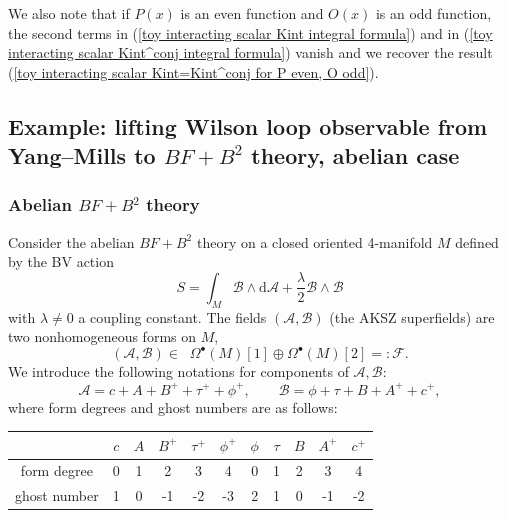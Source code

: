 \documentclass{amsart}
\theoremstyle{plain} %
\theoremstyle{definition}
\theoremstyle{remark}
\newtheorem{rem}[thm]{Remark}
\newcommand{\mr}{\mathrm}
\newcommand{\bt}{\bullet}
\newcommand{\F}{\mathcal{F}}
\newcommand{\ii}{\mathrm{int}}
\newcommand{\A}{\mathcal{A}}
\newcommand{\B}{\mathcal{B}}
\newcommand{\dr}{\mathrm{d}}
\begin{document}
We also note that if $P(x)$ is an even function and $O(x)$ is an odd function, the second terms in (\ref{toy interacting scalar Kint integral formula}) and in (\ref{toy interacting scalar Kint^conj integral formula}) vanish and we recover the result (\ref{toy interacting scalar Kint=Kint^conj for P even, O odd}).




\subsection{Example: lifting Wilson loop observable from Yang--Mills to $BF+B^2$ theory, abelian case}
\label{ss: example - lifting ab Wilson loop}
\subsubsection{Abelian $BF+B^2$ theory}
Consider the abelian $BF+B^2$ theory on a closed oriented 4-manifold $M$ defined by the BV action
\begin{equation}\label{ab BF+BB: S}
    S=\int_M \B \wedge \dr\A+\frac{\lambda}{2} \B\wedge \B
\end{equation}
with $\lambda\neq 0$ a coupling constant. The fields $(\A,\B)$ (the AKSZ superfields) are two nonhomogeneous forms on $M$,
\begin{equation}\label{ab BF+BB: F}
    (\A,\B)\in\;\; \Omega^\bt(M)[1]\oplus \Omega^\bt(M)[2] =\colon \F.
\end{equation}
We introduce the following notations for components of $\A,\B$:
\begin{equation}
    \A=c+A+B^++\tau^++\phi^+,
    \qquad \B= \phi+\tau+B+A^++c^+,
\end{equation}
where form degrees and ghost numbers are as follows:
\begin{center}
\begin{tabular}{c|c|c|c|c|c|c|c|c|c|c}
     & $c$& $A$ & $B^+$ & $\tau^+$ & $\phi^+$ & $\phi$ & $\tau$ & $B$ & $A^+$ & $c^+$  \\ \hline
     form degree & 0 & 1 & 2 & 3 & 4 & 0&1&2&3&4 \\
     ghost number & 1 & 0 & -1&-2&-3&2&1&0&-1&-2
\end{tabular}
\end{center}
\end{document}
